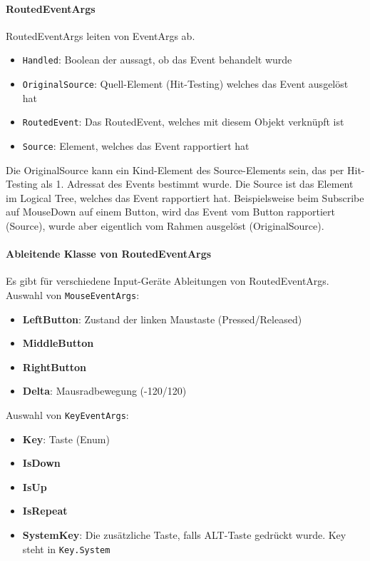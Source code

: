 \paragraph{RoutedEventArgs} RoutedEventArgs leiten von EventArgs ab. 
\begin{itemize}
\item \verb+Handled+: Boolean der aussagt, ob das Event behandelt wurde
\item \verb+OriginalSource+: Quell-Element (Hit-Testing) welches das Event ausgelöst hat
\item \verb+RoutedEvent+: Das RoutedEvent, welches mit diesem Objekt verknüpft ist
\item \verb+Source+: Element, welches das Event rapportiert hat
\end{itemize}
Die OriginalSource kann ein Kind-Element des Source-Elements sein, das per Hit-Testing als 1. Adressat des Events bestimmt wurde. Die Source ist das Element im Logical Tree, welches das Event rapportiert hat. Beispielsweise beim Subscribe auf MouseDown auf einem Button, wird das Event vom Button rapportiert (Source), wurde aber eigentlich vom Rahmen ausgelöst (OriginalSource).
\paragraph{Ableitende Klasse von RoutedEventArgs} Es gibt für verschiedene Input-Geräte Ableitungen von RoutedEventArgs. Auswahl von \verb+MouseEventArgs+:
\begin{itemize}
\item \textbf{LeftButton}: Zustand der linken Maustaste (Pressed/Released)
\item \textbf{MiddleButton}
\item \textbf{RightButton}
\item \textbf{Delta}: Mausradbewegung (-120/120)
\end{itemize}
Auswahl von \verb+KeyEventArgs+:
\begin{itemize}
\item \textbf{Key}: Taste (Enum)
\item \textbf{IsDown}
\item \textbf{IsUp}
\item \textbf{IsRepeat}
\item \textbf{SystemKey}: Die zusätzliche Taste, falls ALT-Taste gedrückt wurde. Key steht in \verb+Key.System+
\end{itemize}
